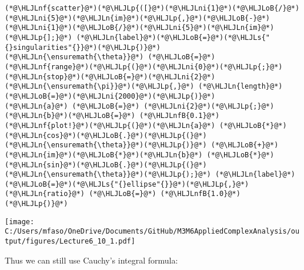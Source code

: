 \documentclass[12pt,landscape]{article}
\newcommand{\HLJLn}[1]{#1}
\newcommand{\HLJLnf}[1]{\textcolor[RGB]{66,102,213}{#1}}
\newcommand{\HLJLs}[1]{\textcolor[RGB]{201,61,57}{#1}}
\newcommand{\HLJLnfB}[1]{\textcolor[RGB]{59,151,46}{#1}}
\newcommand{\HLJLni}[1]{\textcolor[RGB]{59,151,46}{#1}}
\newcommand{\HLJLoB}[1]{\textcolor[RGB]{102,102,102}{\textbf{#1}}}
\newcommand{\HLJLp}[1]{#1}
\def\cent#1{\begin{center}#1\end{center} }
\begin{document}
{\begin{lstlisting}
(*@\HLJLnf{scatter}@*)(*@\HLJLp{([}@*)(*@\HLJLni{1}@*)(*@\HLJLoB{/}@*)(*@\HLJLni{5}@*)(*@\HLJLn{im}@*)(*@\HLJLp{,}@*)(*@\HLJLoB{-}@*)(*@\HLJLni{1}@*)(*@\HLJLoB{/}@*)(*@\HLJLni{5}@*)(*@\HLJLn{im}@*)(*@\HLJLp{];}@*) (*@\HLJLn{label}@*)(*@\HLJLoB{=}@*)(*@\HLJLs{"{}singularities"{}}@*)(*@\HLJLp{)}@*)
(*@\HLJLn{\ensuremath{\theta}}@*) (*@\HLJLoB{=}@*) (*@\HLJLnf{range}@*)(*@\HLJLp{(}@*)(*@\HLJLni{0}@*)(*@\HLJLp{;}@*) (*@\HLJLn{stop}@*)(*@\HLJLoB{=}@*)(*@\HLJLni{2}@*)(*@\HLJLn{\ensuremath{\pi}}@*)(*@\HLJLp{,}@*) (*@\HLJLn{length}@*)(*@\HLJLoB{=}@*)(*@\HLJLni{2000}@*)(*@\HLJLp{)}@*)
(*@\HLJLn{a}@*) (*@\HLJLoB{=}@*) (*@\HLJLni{2}@*)(*@\HLJLp{;}@*) (*@\HLJLn{b}@*)(*@\HLJLoB{=}@*) (*@\HLJLnfB{0.1}@*)
(*@\HLJLnf{plot!}@*)(*@\HLJLp{(}@*)(*@\HLJLn{a}@*) (*@\HLJLoB{*}@*) (*@\HLJLn{cos}@*)(*@\HLJLoB{.}@*)(*@\HLJLp{(}@*)(*@\HLJLn{\ensuremath{\theta}}@*)(*@\HLJLp{)}@*) (*@\HLJLoB{+}@*) (*@\HLJLn{im}@*)(*@\HLJLoB{*}@*)(*@\HLJLn{b}@*) (*@\HLJLoB{*}@*) (*@\HLJLn{sin}@*)(*@\HLJLoB{.}@*)(*@\HLJLp{(}@*)(*@\HLJLn{\ensuremath{\theta}}@*)(*@\HLJLp{);}@*) (*@\HLJLn{label}@*)(*@\HLJLoB{=}@*)(*@\HLJLs{"{}ellipse"{}}@*)(*@\HLJLp{,}@*) (*@\HLJLn{ratio}@*) (*@\HLJLoB{=}@*) (*@\HLJLnfB{1.0}@*)(*@\HLJLp{)}@*)
\end{lstlisting}

\cent{\texttt{[image: C:/Users/mfaso/OneDrive/Documents/GitHub/M3M6AppliedComplexAnalysis/output/figures/Lecture6\_10\_1.pdf]}}

Thus we can still use Cauchy's integral formula:


}
\end{document}
